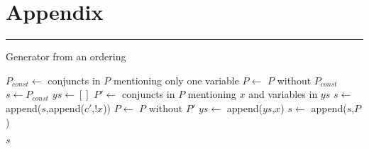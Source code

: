 \documentclass[sigconf,nonacm,review,anonymous]{acmart}
\begin{document}
\clearpage



\clearpage
\appendix
\section*{Appendix}

\begin{center}
\begin{table}[h]
\label{tab:data-full}
\centering
{}
\end{table}
\end{center}
\noindent\rule{0.5\textwidth}{1pt}

\begin{algorithm}
    \caption{Generator from an ordering}
    \label{alg:fixed-ordering}
    \begin{algorithmic}
       \State $P_{const} \gets$ conjuncts in $P$ mentioning only one variable
       \State $P \gets$ $P$ without $P_{const}$
       \State $s \gets P_{const}$ 
       \State $ys \gets []$ 
         \State $P' \gets$ conjuncts in $P$ mentioning $x$ and variables in $ys$
         \State $s \gets$ append($s$,append($c'$,$!x$))
         \State $P \gets$ $P$ without $P'$
         \State $ys \gets$ append($ys$,$x$)
       \EndFor
       \State $s \gets$ append($s$,$P$)
       
       \Return $s$
      \EndFunction
    \end{algorithmic}
\end{algorithm}
\end{document}
